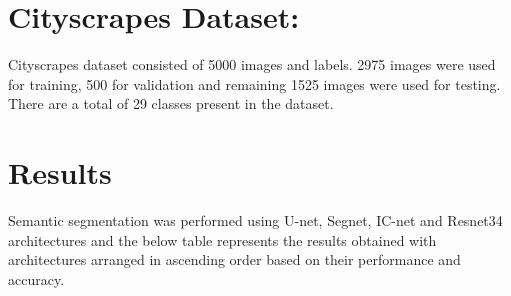 \documentclass{IEEEtran}
\begin{document}
\section{\textbf{Cityscrapes Dataset:}}
Cityscrapes dataset consisted of 5000 images and labels. 2975 images were used for training, 500 for validation and remaining 1525 images were used for testing. There are a total of 29 classes present in the dataset.

\section{\textbf{Results}}
Semantic segmentation was performed using U-net, Segnet, IC-net and Resnet34 architectures and the below table represents the results obtained with architectures arranged in ascending order based on their performance and accuracy.
\end{document}
